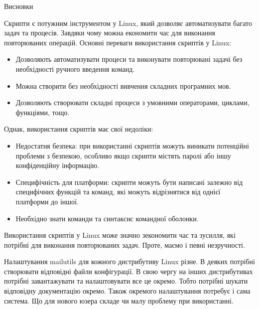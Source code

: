 \documentclass[a4paper,12pt]{article}
\begin{document}
\newpage
    \begin{center}
        \Large{Висновки}
    \end{center}
    Скрипти є потужним інструментом у Linux, який дозволяє автоматизувати багато задач та процесів. Завдяки чому можна економити час для виконання повторюваних операцій.
    Основні переваги використання скриптів у Linux:
    \begin{itemize}
        \item Дозволяють автоматизувати процеси та виконувати повторювані задачі без необхідності ручного введення команд.
        \item Можна створити без необхідності вивчення складних програмних мов.
        \item Дозволяють створювати складні процеси з умовними операторами, циклами, функціями, тощо.
    \end{itemize}
    Однак, використання скриптів має свої недоліки:
    \begin{itemize}
        \item Недостатня безпека: при використанні скриптів можуть виникати потенційні проблеми з безпекою, особливо якщо скрипти містять паролі або іншу конфіденційну інформацію.
        \item Специфічність для платформи: скрипти можуть бути написані залежно від специфічних функцій та команд, які можуть відрізнятися від однієї платформи до іншої.
        \item Необхідно знати команди та синтаксис командної оболонки.
    \end{itemize}

    Використання скриптів у Linux може значно зекономити час та зусилля, які потрібні для виконання повторюваних задач. Проте, маємо і певні незручності.

    Налаштування mailutils для кожного дистрибутиву Linux різне. В деяких потрібні створювати відповідні файли конфігурації. В свою чергу на інших дистрибутивах
    потрібні завантажувати та налаштовувати все це окремо. Тобто потрібні шукати відповідну документацію окремо. Також окремого налаштування потребує і сама система.
    Що для нового юзера складе чи малу проблему при використанні.
    
\end{document}
